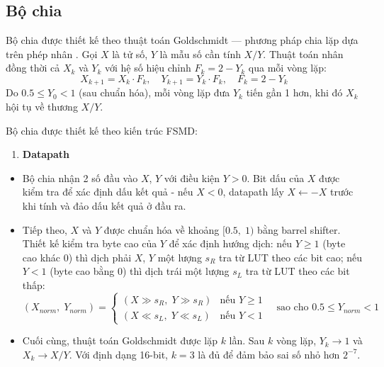 \documentclass{uetgraduation}
\begin{document}
\subsection{Bộ chia}
Bộ chia được thiết kế theo thuật toán Goldschmidt --- phương pháp chia
lặp dựa trên phép nhân \cite{goldschmidt1964}. Gọi $X$ là tử số,
$Y$ là mẫu số cần tính $X/Y$. Thuật toán nhân đồng thời cả $X_k$ và
$Y_k$ với hệ số hiệu chỉnh $F_k = 2 - Y_k$ qua mỗi vòng lặp:
\begin{equation}
    X_{k+1} = X_k \cdot F_k, \quad
    Y_{k+1} = Y_k \cdot F_k, \quad
    F_k = 2 - Y_k
\end{equation}
Do $0.5 \leq Y_0 < 1$ (sau chuẩn hóa), mỗi vòng lặp đưa $Y_k$ tiến
gần 1 hơn, khi đó $X_k$ hội tụ về thương $X/Y$.

Bộ chia được thiết kế theo kiến trúc FSMD:
\begin{enumerate}
    \item \textbf{Datapath}
\end{enumerate}
\begin{itemize}
    \item Bộ chia nhận 2 số đầu vào $X$, $Y$ với điều kiện $Y > 0$. Bit dấu
    của $X$ được kiểm tra để xác định dấu kết quả - nếu $X < 0$, datapath
    lấy $X \leftarrow -X$ trước khi tính và đảo dấu kết quả ở đầu ra.

    \item Tiếp theo, $X$ và $Y$ được chuẩn hóa về khoảng $[0.5,\; 1)$ bằng
    barrel shifter. Thiết kế kiểm tra byte cao của $Y$ để xác định hướng dịch:
    nếu $Y \geq 1$ (byte cao khác 0) thì dịch phải $X$, $Y$ một lượng $s_R$
    tra từ LUT theo các bit cao; nếu $Y < 1$ (byte cao bằng 0) thì dịch trái
    một lượng $s_L$ tra từ LUT theo các bit thấp:
    \begin{equation}
        (X_{norm},\; Y_{norm}) =
        \begin{cases}
            (X \gg s_R,\; Y \gg s_R) & \text{nếu } Y \geq 1 \\
            (X \ll s_L,\; Y \ll s_L) & \text{nếu } Y < 1
        \end{cases}
        \quad \text{sao cho } 0.5 \leq Y_{norm} < 1
    \end{equation}

    \item Cuối cùng, thuật toán Goldschmidt được lặp $k$ lần. Sau $k$ vòng lặp, $Y_k \to 1$ và $X_k \to X/Y$. Với định dạng 16-bit,
    $k = 3$ là đủ để đảm bảo sai số nhỏ hơn $2^{-7}$.
\end{itemize}
\end{document}

